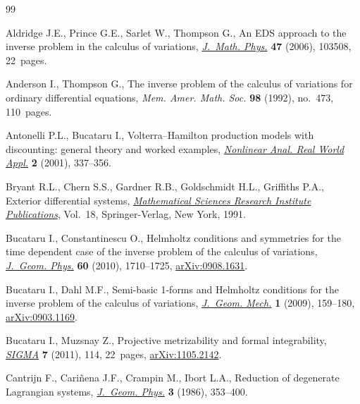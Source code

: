 \documentclass[pdftex]{sigma}
\begin{document}
\begin{thebibliography}{99}
\footnotesize\itemsep=0pt

Aldridge J.E., Prince G.E., Sarlet W., Thompson G., An {EDS} approach to the
  inverse problem in the calculus of variations, \href{http://dx.doi.org/10.1063/1.2358000}{\textit{J.~Math. Phys.}}
  \textbf{47} (2006), 103508, 22~pages.

Anderson I., Thompson G., The inverse problem of the calculus of variations for
  ordinary dif\/ferential equations, \textit{Mem. Amer. Math. Soc.} \textbf{98}
  (1992), no.~473, 110~pages.

Antonelli P.L., Bucataru I., Volterra--{H}amilton production models with
  discounting: general theory and worked examples, \href{http://dx.doi.org/10.1016/S0362-546X(00)00101-2}{\textit{Nonlinear Anal. Real
  World Appl.}} \textbf{2} (2001), 337--356.

Bryant R.L., Chern S.S., Gardner R.B., Goldschmidt H.L., Grif\/f\/iths P.A.,
  Exterior dif\/ferential systems, \href{http://dx.doi.org/10.1007/978-1-4613-9714-4}{\textit{Mathematical Sciences Research
  Institute Publications}}, Vol.~18, Springer-Verlag, New York, 1991.

Bucataru I., Constantinescu O., Helmholtz conditions and symmetries for the
  time dependent case of the inverse problem of the calculus of variations,
  \href{http://dx.doi.org/10.1016/j.geomphys.2010.06.016}{\textit{J.~Geom. Phys.}} \textbf{60} (2010), 1710--1725, \href{http://arxiv.org/abs/0908.1631}{arXiv:0908.1631}.

Bucataru I., Dahl M.F., Semi-basic 1-forms and {H}elmholtz conditions for the
  inverse problem of the calculus of variations, \href{http://dx.doi.org/10.3934/jgm.2009.1.159}{\textit{J.~Geom. Mech.}}
  \textbf{1} (2009), 159--180, \href{http://arxiv.org/abs/0903.1169}{arXiv:0903.1169}.

Bucataru I., Muzsnay Z., Projective metrizability and formal integrability,
  \href{http://dx.doi.org/10.3842/SIGMA.2011.114}{\textit{SIGMA}} \textbf{7} (2011), 114, 22~pages, \href{http://arxiv.org/abs/1105.2142}{arXiv:1105.2142}.

Cantrijn F., Cari{\~n}ena J.F., Crampin M., Ibort L.A., Reduction of degenerate
  {L}agrangian systems, \href{http://dx.doi.org/10.1016/0393-0440(86)90014-8}{\textit{J.~Geom. Phys.}} \textbf{3} (1986), 353--400.


\end{thebibliography}
\end{document}
